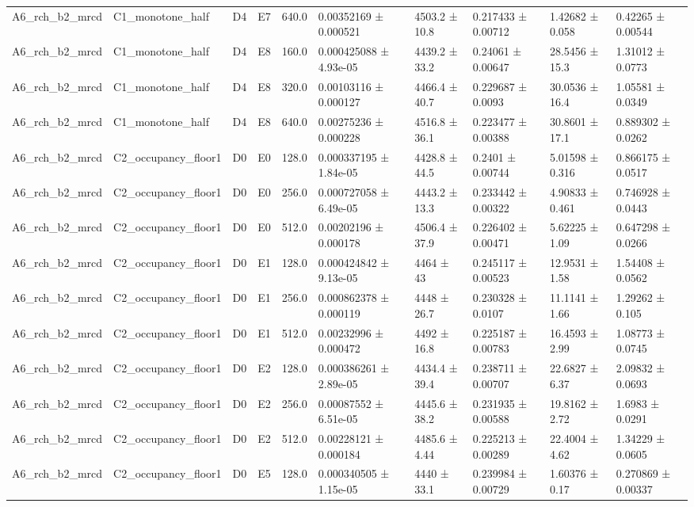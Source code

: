 \begin{table}
\begin{tabular}{llllllllll}
A6\_rch\_b2\_mrcd & C1\_monotone\_half & D4 & E7 & 640.0 & 0.00352169 ± 0.000521 & 4503.2 ± 10.8 & 0.217433 ± 0.00712 & 1.42682 ± 0.058 & 0.42265 ± 0.00544 \\
A6\_rch\_b2\_mrcd & C1\_monotone\_half & D4 & E8 & 160.0 & 0.000425088 ± 4.93e-05 & 4439.2 ± 33.2 & 0.24061 ± 0.00647 & 28.5456 ± 15.3 & 1.31012 ± 0.0773 \\
A6\_rch\_b2\_mrcd & C1\_monotone\_half & D4 & E8 & 320.0 & 0.00103116 ± 0.000127 & 4466.4 ± 40.7 & 0.229687 ± 0.0093 & 30.0536 ± 16.4 & 1.05581 ± 0.0349 \\
A6\_rch\_b2\_mrcd & C1\_monotone\_half & D4 & E8 & 640.0 & 0.00275236 ± 0.000228 & 4516.8 ± 36.1 & 0.223477 ± 0.00388 & 30.8601 ± 17.1 & 0.889302 ± 0.0262 \\
A6\_rch\_b2\_mrcd & C2\_occupancy\_floor1 & D0 & E0 & 128.0 & 0.000337195 ± 1.84e-05 & 4428.8 ± 44.5 & 0.2401 ± 0.00744 & 5.01598 ± 0.316 & 0.866175 ± 0.0517 \\
A6\_rch\_b2\_mrcd & C2\_occupancy\_floor1 & D0 & E0 & 256.0 & 0.000727058 ± 6.49e-05 & 4443.2 ± 13.3 & 0.233442 ± 0.00322 & 4.90833 ± 0.461 & 0.746928 ± 0.0443 \\
A6\_rch\_b2\_mrcd & C2\_occupancy\_floor1 & D0 & E0 & 512.0 & 0.00202196 ± 0.000178 & 4506.4 ± 37.9 & 0.226402 ± 0.00471 & 5.62225 ± 1.09 & 0.647298 ± 0.0266 \\
A6\_rch\_b2\_mrcd & C2\_occupancy\_floor1 & D0 & E1 & 128.0 & 0.000424842 ± 9.13e-05 & 4464 ± 43 & 0.245117 ± 0.00523 & 12.9531 ± 1.58 & 1.54408 ± 0.0562 \\
A6\_rch\_b2\_mrcd & C2\_occupancy\_floor1 & D0 & E1 & 256.0 & 0.000862378 ± 0.000119 & 4448 ± 26.7 & 0.230328 ± 0.0107 & 11.1141 ± 1.66 & 1.29262 ± 0.105 \\
A6\_rch\_b2\_mrcd & C2\_occupancy\_floor1 & D0 & E1 & 512.0 & 0.00232996 ± 0.000472 & 4492 ± 16.8 & 0.225187 ± 0.00783 & 16.4593 ± 2.99 & 1.08773 ± 0.0745 \\
A6\_rch\_b2\_mrcd & C2\_occupancy\_floor1 & D0 & E2 & 128.0 & 0.000386261 ± 2.89e-05 & 4434.4 ± 39.4 & 0.238711 ± 0.00707 & 22.6827 ± 6.37 & 2.09832 ± 0.0693 \\
A6\_rch\_b2\_mrcd & C2\_occupancy\_floor1 & D0 & E2 & 256.0 & 0.00087552 ± 6.51e-05 & 4445.6 ± 38.2 & 0.231935 ± 0.00588 & 19.8162 ± 2.72 & 1.6983 ± 0.0291 \\
A6\_rch\_b2\_mrcd & C2\_occupancy\_floor1 & D0 & E2 & 512.0 & 0.00228121 ± 0.000184 & 4485.6 ± 4.44 & 0.225213 ± 0.00289 & 22.4004 ± 4.62 & 1.34229 ± 0.0605 \\
A6\_rch\_b2\_mrcd & C2\_occupancy\_floor1 & D0 & E5 & 128.0 & 0.000340505 ± 1.15e-05 & 4440 ± 33.1 & 0.239984 ± 0.00729 & 1.60376 ± 0.17 & 0.270869 ± 0.00337 \\

\end{tabular}
\end{table}
